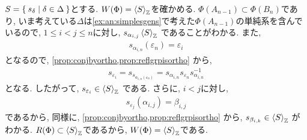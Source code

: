 $S=\Set{s_\delta|\delta\in\Delta}$とする.
$W(\Phi)=\Braket{S}_{\mathbb{Z}}$を確かめる.
$\Phi(A_{n-1})\subset\Phi(B_n)$であり,
いま考えている$\Delta$は\cref{ex:an:simplesgens}で考えた$\Phi(A_{n-1})$の単純系を含んでいるので,
$1\leq i<j\leq n$に対し,
$s_{\alpha_{i,j}}\Braket{S}_{\mathbb{Z}}$
であることがわかる.
また,
\begin{align*}
  s_{\alpha_{i,n}}(\varepsilon_{n})=\varepsilon_{i}
\end{align*}
となるので,
\cref{prop:conjbyortho,prop:reflgrpisortho}
から,
\begin{align*}
  s_{\varepsilon_{i}}=s_{s_{\alpha_{i,n}(\varepsilon_{n})}}=
    s_{\alpha_{i,n}}s_{\varepsilon_{n}}s_{\alpha_{i,n}}^{-1}
\end{align*}
となる.
したがって, $s_{\varepsilon_{i}}\in\Braket{S}_{\mathbb{Z}}$
である.
さらに, $i<j$に対し,
\begin{align*}
  s_{\varepsilon_{j}}(\alpha_{i,j})=\beta_{i,j}
\end{align*}
であるから, 同様に, 
\cref{prop:conjbyortho,prop:reflgrpisortho}
から,
$s_{\beta_{i,k}}\in\Braket{S}_{\mathbb{Z}}$
がわかる.
$R(\Phi)\subset \Braket{S}_{\mathbb{Z}}$であるから,
$W(\Phi)=\Braket{S}_{\mathbb{Z}}$である.


